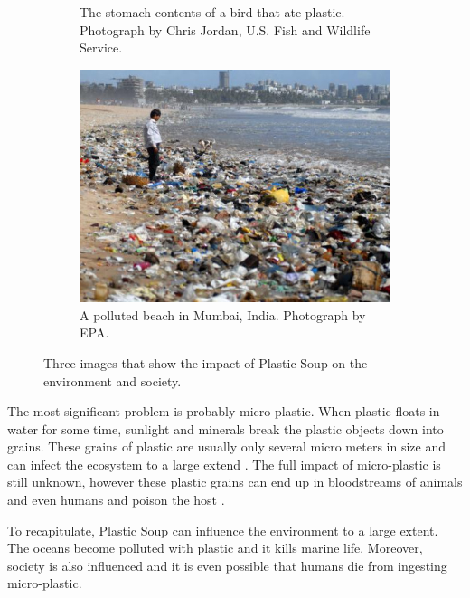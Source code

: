 \begin{figure}
\begin{minipage}{\widefigwidth}
\begin{subfigure}[t]{.48\textwidth}
	\caption{The stomach contents of a bird that ate plastic. Photograph by Chris Jordan, U.S. Fish and Wildlife Service.}
	\label{fig:plastic-bird}
   \end{subfigure}
   \hfill
   \begin{subfigure}[t]{.48\textwidth}
    \ifx\showfig\undefined
	 \includegraphics[keepaspectratio=true,width=\textwidth]{images/plastic-beach.jpg} \fi
	\caption{A polluted beach in Mumbai, India. Photograph by EPA.}
	\label{fig:plastic-beach}
   \end{subfigure}
   \caption{Three images that show the impact of Plastic Soup on the environment and society.}%
   \label{fig:plastic-impact}
   \end{minipage}
\end{figure}

The most significant problem is probably micro-plastic.
When plastic floats in water for some time, sunlight and minerals break the plastic objects down into grains.
These grains of plastic are usually only several micro meters in size and can infect the ecosystem to a large extend \citep{moore2011plastic}.
The full impact of micro-plastic is still unknown, however these plastic grains can end up in bloodstreams of animals and even humans and poison the host \citep{von2012uptake}.

To recapitulate, Plastic Soup can influence the environment to a large extent.
The oceans become polluted with plastic and it kills marine life. Moreover, society is also influenced and it is even possible that humans die from ingesting micro-plastic.

